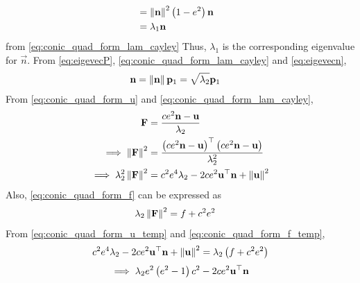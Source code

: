 \documentclass[journal,12pt,twocolumn]{IEEEtran}
\renewcommand\thesection{\arabic{section}}
\renewcommand\thesubsection{\thesection.\arabic{subsection}}
\begin{document}
\begin{enumerate}[label=\thesubsection.\arabic*.,ref=\thesubsection.\theenumi]
\begin{align}
\\
&=\left\lVert\mathbf{n}\right\rVert^2\left(1-e^2\right)\mathbf{n} 
 \\
  &=\lambda_1 \mathbf{n} 
  \label{eq:eigevecn}
\end{align}  
from \eqref{eq:conic_quad_form_lam_cayley}
Thus,  $\lambda_1$ is the corresponding eigenvalue for $\vec{n}$.  From       \eqref{eq:eigevecP},   \eqref{eq:conic_quad_form_lam_cayley} and \eqref{eq:eigevecn}, 
\begin{align}
   \mathbf{n}&= \left\lVert\mathbf{n}\right\rVert\mathbf{p}_1  = \sqrt{\lambda_2}\mathbf{p}_1 
\end{align}  
From \eqref{eq:conic_quad_form_u} and \eqref{eq:conic_quad_form_lam_cayley},
\begin{align}
\mathbf{F}  &= \frac{ce^2\mathbf{n}-\mathbf{u}}{\lambda_2}
 \\
 \implies \left\lVert\mathbf{F}\right\rVert^2  &= \frac{\left(ce^2\mathbf{n}-\mathbf{u}\right)^{\top}\left(ce^2\mathbf{n}-\mathbf{u}\right)}{\lambda_2^2}
 \\
 \implies \lambda_2^2\left\lVert\mathbf{F}\right\rVert^2  &= c^2e^4\lambda_2-2ce^2\mathbf{u}^{\top}\mathbf{n}+\left\lVert\mathbf{u}\right\rVert^2
 \label{eq:conic_quad_form_u_temp}
    \end{align}
    Also, \eqref{eq:conic_quad_form_f} can be expressed as
    \begin{align}
    \lambda_2\left\lVert\mathbf{F}\right\rVert^2 &= f+c^2e^2
    \label{eq:conic_quad_form_f_temp}
\end{align}
From  \eqref{eq:conic_quad_form_u_temp} and     \eqref{eq:conic_quad_form_f_temp},
\begin{align}
c^2e^4\lambda_2-2ce^2\mathbf{u}^{\top}\mathbf{n}+\left\lVert\mathbf{u}\right\rVert^2 = \lambda_2\left(f+c^2e^2\right)
\end{align}
\begin{multline}
\implies \lambda_2e^2\brak{e^2-1}c^2-2ce^2\vec{u}^{\top}\vec{n}

\end{multline}
\end{enumerate}
\end{document}

